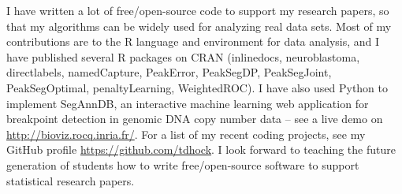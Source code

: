 \documentclass{article}
\begin{document}
I have written a lot of free/open-source code to support my research
papers, so that my algorithms can be widely used for analyzing
real
data sets. Most of my contributions are to the R language and
environment for data analysis, and I have published several R packages
on CRAN (inlinedocs, neuroblastoma, directlabels, namedCapture,
PeakError, PeakSegDP, PeakSegJoint, PeakSegOptimal, penaltyLearning,
WeightedROC). I have also used Python to implement SegAnnDB, an interactive
machine learning web application for breakpoint detection in genomic DNA copy
number data -- see a live demo on
\url{http://bioviz.rocq.inria.fr/}. 
For a list of my recent coding projects, see my GitHub profile
\url{https://github.com/tdhock}. I look forward to teaching the future
generation of students how to write free/open-source software to support
statistical research papers.



\end{document}

